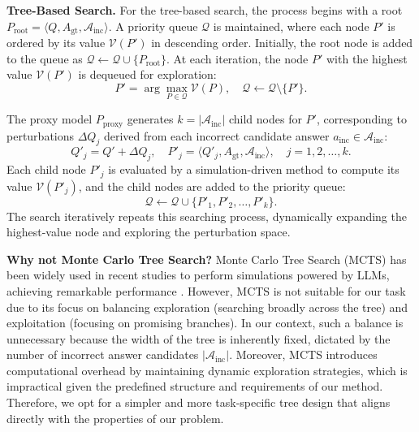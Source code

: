 {\textbf{Tree-Based Search.} For the tree-based search, the process begins with a root \( P_\text{root} = \langle Q, A_\text{gt}, \mathcal{A}_\text{inc} \rangle \). A priority queue \( \mathcal{Q} \) is maintained, where each node \( P' \) is ordered by its value \( \mathcal{V}(P') \) in descending order. Initially, the root node is added to the queue as $\mathcal{Q} \gets \mathcal{Q} \cup \{P_\text{root}\}$. At each iteration, the node \( P' \) with the highest value \( \mathcal{V}(P') \) is dequeued for exploration:
\begin{equation}
P' = \arg\max_{P \in \mathcal{Q}} \mathcal{V}(P), \quad \mathcal{Q} \gets \mathcal{Q} \setminus \{P'\}.
\end{equation}

The proxy model \( P_\text{proxy} \) generates \( k = |\mathcal{A}_\text{inc}| \) child nodes for \( P' \), corresponding to perturbations \( \Delta Q_j \) derived from each incorrect candidate answer \( a_\text{inc} \in \mathcal{A}_\text{inc} \):
\begin{equation}
Q'_j = Q' + \Delta Q_j, \quad P'_j = \langle Q'_j, A_\text{gt}, \mathcal{A}_\text{inc} \rangle, \quad j = 1, 2, \dots, k.
\end{equation}
Each child node \( P'_j \) is evaluated by a simulation-driven method to compute its value \( \mathcal{V}(P'_j) \), and the child nodes are added to the priority queue:
\begin{equation}
\mathcal{Q} \gets \mathcal{Q} \cup \{P'_1, P'_2, \dots, P'_k\}.
\end{equation}
The search iteratively repeats this searching process, dynamically expanding the highest-value node and exploring the perturbation space. 

\textbf{Why not Monte Carlo Tree Search?} Monte Carlo Tree Search (MCTS) \citep{browne2012survey} has been widely used in recent studies to perform simulations powered by LLMs, achieving remarkable performance \citep{zhang2024rest, wang2024seed, xie2024monte, guan2025rstar}. However, MCTS is not suitable for our task due to its focus on balancing exploration (searching broadly across the tree) and exploitation (focusing on promising branches). In our context, such a balance is unnecessary because the width of the tree is inherently fixed, dictated by the number of incorrect answer candidates $|\mathcal{A}_\text{inc}|$. Moreover, MCTS introduces computational overhead by maintaining dynamic exploration strategies, which is impractical given the predefined structure and requirements of our method. Therefore, we opt for a simpler and more task-specific tree design that aligns directly with the properties of our problem.


}
